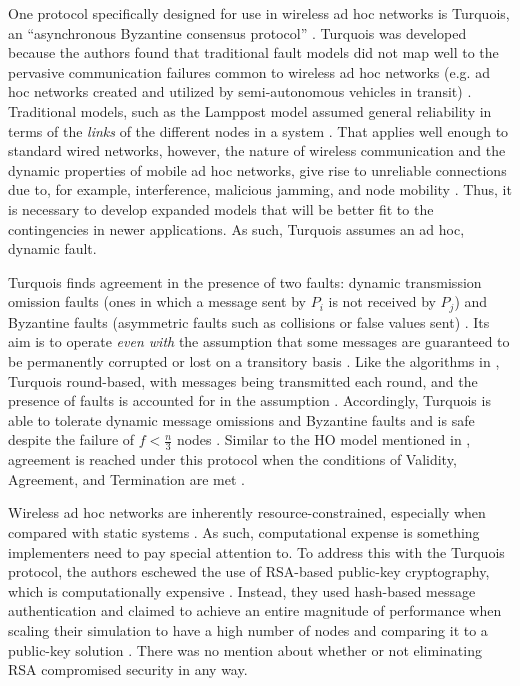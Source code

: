 \documentclass[twoside, conference]{IEEEtran}
\begin{document}

One protocol specifically designed for use in wireless ad hoc networks is Turquois, an ``asynchronous Byzantine consensus protocol'' \cite{Moniz2013}. Turquois was developed because the authors found that traditional fault models did not map well to the pervasive communication failures common to wireless ad hoc networks (e.g. ad hoc networks created and utilized by semi-autonomous vehicles in transit) \cite{Moniz2013}. Traditional models, such as the Lamppost model assumed general reliability in terms of the \textit{links} of the different nodes in a system \cite{Moniz2013}. That applies well enough to standard wired networks, however, the nature of wireless communication and the dynamic properties of mobile ad hoc networks, give rise to unreliable connections due to, for example, interference, malicious jamming, and node mobility \cite{Moniz2013}. Thus, it is necessary to develop expanded models that will be better fit to the contingencies in newer applications. As such, Turquois assumes an ad hoc, dynamic fault\cite{Moniz2013}.

Turquois finds agreement in the presence of two faults: dynamic transmission omission faults (ones in which a message sent by $P_i$ is not received by $P_j$) and Byzantine faults (asymmetric faults such as collisions or false values sent) \cite{Moniz2013}. Its aim is to operate \textit{even with} the assumption that some messages are guaranteed to be permanently corrupted or lost on a transitory basis \cite{Moniz2013}. Like the algorithms in \cite{Biely2007}, Turquois round-based, with messages being transmitted each round, and the presence of faults is accounted for in the assumption \cite{Moniz2013}. Accordingly, Turquois is able to tolerate dynamic message omissions and Byzantine faults and is safe despite the failure of $f < \frac{n}{3}$ nodes \cite{Moniz2013}. Similar to the HO model mentioned in \cite{Biely2007}, agreement is reached under this protocol when the conditions of Validity, Agreement, and Termination are met \cite{Moniz2013}.

Wireless ad hoc networks are inherently resource-constrained, especially when compared with static systems \cite{Moniz2013}. As such, computational expense is something implementers need to pay special attention to. To address this with the Turquois protocol, the authors eschewed the use of RSA-based public-key cryptography, which is computationally expensive \cite{Moniz2013}. Instead, they used hash-based message authentication and claimed to achieve an entire magnitude of performance when scaling their simulation to have a high number of nodes and comparing it to a public-key solution \cite{Moniz2013}. There was no mention about whether or not eliminating RSA compromised security in any way.
\end{document}
